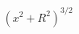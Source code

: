 \documentclass[preview]{standalone}
\begin{document}
\begin{align*}
{(x^2 + R^2)^{3/2}}
\end{align*}
\end{document}
